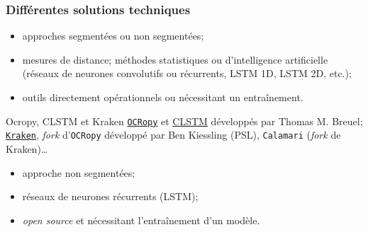 \documentclass[10pt, compress,urlcolor=blue]{beamer}
\begin{document}
\begin{frame}
		\frametitle{Différentes solutions techniques}
		
		
		\begin{itemize}
			\item approches segmentées ou non segmentées;
			\item mesures de distance; méthodes statistiques ou d'intelligence artificielle (réseaux de neurones convolutifs ou récurrents, LSTM 1D, LSTM 2D, etc.);
			\item outils directement opérationnels ou nécessitant un entraînement.
		\end{itemize}
		
		
		\begin{block}{Ocropy, CLSTM et Kraken}
			\href{https://github.com/tmbdev/ocropy}{\texttt{OCRopy}} et \href{http://github.com/tmbdev/clstm}{CLSTM} développés par Thomas M. Breuel; \href{https://github.com/mittagessen/kraken}{\texttt{Kraken}}, \textit{fork} d'\texttt{OCRopy} développé par Ben Kiessling (PSL), \texttt{Calamari} (\textit{fork} de Kraken)…
			\begin{itemize}
				\item approche non segmentées;
				\item réseaux de neurones récurrents (LSTM);
				\item \textit{open source} et nécessitant l'entraînement d'un modèle.
			\end{itemize}
		\end{block}
		
	\end{frame}
	
\end{document}
